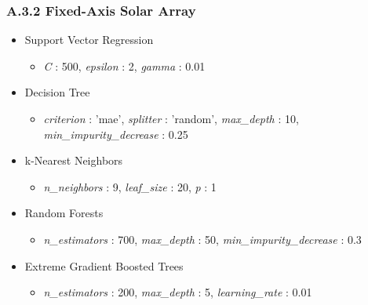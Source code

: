 \subsubsection*{A.3.2 \hspace{0.5em} Fixed-Axis Solar Array}
\begin{itemize}
    \item Support Vector Regression
    \begin{itemize}
        \item \textit{C} : 500, \textit{epsilon} : 2,  \textit{gamma} : 0.01
    \end{itemize}

    \item Decision Tree 
    \begin{itemize}
        \item \textit{criterion} : 'mae', \textit{splitter} : 'random', \textit{max\_depth} : 10, \textit{min\_impurity\_decrease} : 0.25 
    \end{itemize}

    \item k-Nearest Neighbors 
    \begin{itemize}
        \item \textit{n\_neighbors} : 9, \textit{leaf\_size} : 20, \textit{p} : 1
    \end{itemize}

    \item Random Forests 
    \begin{itemize}
        \item \textit{n\_estimators} : 700, \textit{max\_depth} : 50, \textit{min\_impurity\_decrease} : 0.3 
    \end{itemize}

    \item Extreme Gradient Boosted Trees
    \begin{itemize}
        \item \textit{n\_estimators} : 200, \textit{max\_depth} : 5, \textit{learning\_rate} : 0.01 
    \end{itemize}

\end{itemize}

